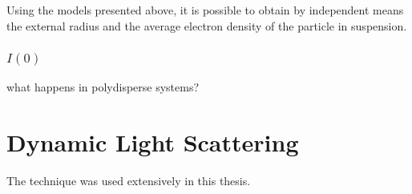 Using the models presented above, it is possible to obtain by independent means the external radius and the average electron density of the particle in suspension.
\subsubsection{$I(0)$}
what happens in polydisperse systems?

\section{Dynamic Light Scattering}

The technique was used extensively in this thesis.
